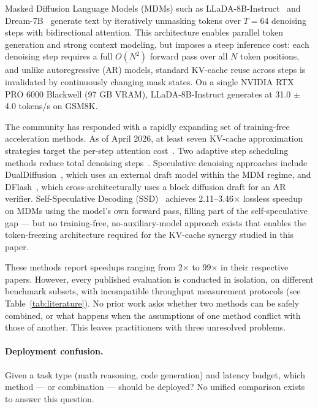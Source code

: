 \documentclass{article}
\begin{document}
Masked Diffusion Language Models (MDMs) such as LLaDA-8B-Instruct~\cite{llada} and
Dream-7B~\cite{dream7b} generate text by iteratively unmasking tokens over $T = 64$ denoising steps
with bidirectional attention. This architecture enables parallel token generation and strong context
modeling, but imposes a steep inference cost: each denoising step requires a full $O(N^2)$ forward
pass over all $N$ token positions, and unlike autoregressive (AR) models, standard KV-cache reuse
across steps is invalidated by continuously changing mask states. On a single NVIDIA RTX PRO 6000
Blackwell (97 GB VRAM), LLaDA-8B-Instruct generates at 31.0 $\pm$ 4.0 tokens/s on GSM8K.

The community has responded with a rapidly expanding set of training-free acceleration methods. As
of April 2026, at least seven KV-cache approximation strategies target the per-step attention
cost~\cite{fastdllm,dkvcache,elasticcache,entropycache,flashdlm,windowdiffusion,slowfast}. Two
adaptive step scheduling methods reduce total denoising steps~\cite{saber,prr}. Speculative
denoising approaches include DualDiffusion~\cite{dualdiffusion}, which uses an external draft model
within the MDM regime, and DFlash~\cite{dflash}, which cross-architecturally uses a block diffusion
draft for an AR verifier. Self-Speculative Decoding (SSD)~\cite{ssd} achieves 2.11--3.46$\times$
lossless speedup on MDMs using the model's own forward pass, filling part of the self-speculative
gap --- but no training-free, no-auxiliary-model approach exists that enables the token-freezing
architecture required for the KV-cache synergy studied in this paper.

These methods report speedups ranging from 2$\times$ to 99$\times$ in their respective papers.
However, every published evaluation is conducted in isolation, on different benchmark subsets, with
incompatible throughput measurement protocols (see Table~\ref{tab:literature}). No prior work asks
whether two methods can be safely combined, or what happens when the assumptions of one method
conflict with those of another. This leaves practitioners with three unresolved problems.

\paragraph{Deployment confusion.} Given a task type (math reasoning, code generation) and latency
budget, which method --- or combination --- should be deployed? No unified comparison exists to
answer this question.
\end{document}
